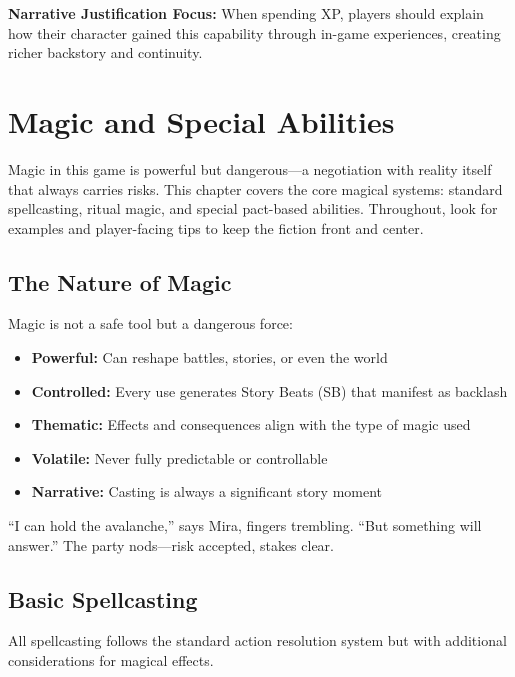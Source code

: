 \documentclass[11pt,twoside,openany]{book}
\begin{document}
\textbf{Narrative Justification Focus:} When spending XP, players should explain how their character gained this capability through in-game experiences, creating richer backstory and continuity.

\chapter{Magic and Special Abilities} \label{ch:magic}

Magic in this game is powerful but dangerous---a negotiation with reality itself that always carries risks. This chapter covers the core magical systems: standard spellcasting, ritual magic, and special pact-based abilities. Throughout, look for examples and player-facing tips to keep the fiction front and center.

\section*{The Nature of Magic} 

Magic is not a safe tool but a dangerous force:
\begin{itemize}
\item \textbf{Powerful:} Can reshape battles, stories, or even the world
\item \textbf{Controlled:} Every use generates Story Beats (SB) that manifest as backlash
\item \textbf{Thematic:} Effects and consequences align with the type of magic used
\item \textbf{Volatile:} Never fully predictable or controllable
\item \textbf{Narrative:} Casting is always a significant story moment
\end{itemize}

\begin{tcolorbox}[colback=gray!5!white, colframe=gray!75!black, title=Table Vignette, fonttitle=\bfseries,breakable]
``I can hold the avalanche,'' says Mira, fingers trembling. ``But something will answer.'' The party nods---risk accepted, stakes clear.
\end{tcolorbox}

\section*{Basic Spellcasting} 

All spellcasting follows the standard action resolution system but with additional considerations for magical effects.
\end{document}
